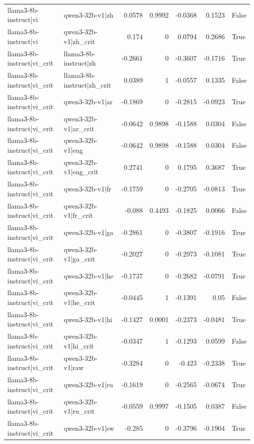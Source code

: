 \begin{table}
\begin{tabular}{l l r r r r l}
llama3-8b-instruct|vi & qwen3-32b-v1|zh & 0.0578 & 0.9992 & -0.0368 & 0.1523 & False \\
llama3-8b-instruct|vi & qwen3-32b-v1|zh_crit & 0.174 & 0 & 0.0794 & 0.2686 & True \\
llama3-8b-instruct|vi_crit & llama3-8b-instruct|zh & -0.2661 & 0 & -0.3607 & -0.1716 & True \\
llama3-8b-instruct|vi_crit & llama3-8b-instruct|zh_crit & 0.0389 & 1 & -0.0557 & 0.1335 & False \\
llama3-8b-instruct|vi_crit & qwen3-32b-v1|ar & -0.1869 & 0 & -0.2815 & -0.0923 & True \\
llama3-8b-instruct|vi_crit & qwen3-32b-v1|ar_crit & -0.0642 & 0.9898 & -0.1588 & 0.0304 & False \\
llama3-8b-instruct|vi_crit & qwen3-32b-v1|eng & -0.0642 & 0.9898 & -0.1588 & 0.0304 & False \\
llama3-8b-instruct|vi_crit & qwen3-32b-v1|eng_crit & 0.2741 & 0 & 0.1795 & 0.3687 & True \\
llama3-8b-instruct|vi_crit & qwen3-32b-v1|fr & -0.1759 & 0 & -0.2705 & -0.0813 & True \\
llama3-8b-instruct|vi_crit & qwen3-32b-v1|fr_crit & -0.088 & 0.4493 & -0.1825 & 0.0066 & False \\
llama3-8b-instruct|vi_crit & qwen3-32b-v1|ga & -0.2861 & 0 & -0.3807 & -0.1916 & True \\
llama3-8b-instruct|vi_crit & qwen3-32b-v1|ga_crit & -0.2027 & 0 & -0.2973 & -0.1081 & True \\
llama3-8b-instruct|vi_crit & qwen3-32b-v1|he & -0.1737 & 0 & -0.2682 & -0.0791 & True \\
llama3-8b-instruct|vi_crit & qwen3-32b-v1|he_crit & -0.0445 & 1 & -0.1391 & 0.05 & False \\
llama3-8b-instruct|vi_crit & qwen3-32b-v1|hi & -0.1427 & 0.0001 & -0.2373 & -0.0481 & True \\
llama3-8b-instruct|vi_crit & qwen3-32b-v1|hi_crit & -0.0347 & 1 & -0.1293 & 0.0599 & False \\
llama3-8b-instruct|vi_crit & qwen3-32b-v1|raw & -0.3284 & 0 & -0.423 & -0.2338 & True \\
llama3-8b-instruct|vi_crit & qwen3-32b-v1|ru & -0.1619 & 0 & -0.2565 & -0.0674 & True \\
llama3-8b-instruct|vi_crit & qwen3-32b-v1|ru_crit & -0.0559 & 0.9997 & -0.1505 & 0.0387 & False \\
llama3-8b-instruct|vi_crit & qwen3-32b-v1|sw & -0.285 & 0 & -0.3796 & -0.1904 & True \\

\end{tabular}
\end{table}
